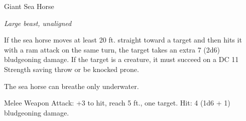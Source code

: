 \begin{monsterbox}{Giant Sea Horse}
\begin{hangingpar}
\textit{Large beast, unaligned}
\end{hangingpar}
\dndline%
\basics[%
armorclass = 13,
hitpoints = 3d10,
speed = {0 ft., swim 40 ft.}
]
\dndline%
\stats[%
STR = \stat{12},
DEX = \stat{15},
CON = \stat{11},
INT = \stat{2},
WIS = \stat{12},
CHA = \stat{5}
]
\dndline%
\details[%
skills={},
damageimmunities={},
savingthrows={},
conditionimmunities={},
damageresistances={},
damagevulnerabilities={},
senses={passive Perception 11},
challenge=1/2
]
\dndline%
\begin{monsteraction}[Charge]
If the sea horse moves at least 20 ft. straight toward a target and then hits it with a ram attack on the same turn, the target takes an extra 7 (2d6) bludgeoning damage. If the target is a creature, it must succeed on a DC 11 Strength saving throw or be knocked prone.
\end{monsteraction}
\begin{monsteraction}
The sea horse can breathe only underwater.
\end{monsteraction}
\begin{monsteraction}[Ram]
Melee Weapon Attack: +3 to hit, reach 5 ft., one target. Hit: 4 (1d6 + 1) bludgeoning damage.
\end{monsteraction}
\end{monsterbox}